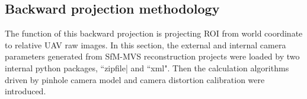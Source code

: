\subsection{Backward projection methodology}
\label{spp:backward}

% 

The function of this backward projection is projecting ROI from world coordinate to relative UAV raw images. In this section, the external and internal camera parameters generated from SfM-MVS reconstruction projects were loaded by two internal python packages, ``zipfile| and ``xml". Then the calculation algorithms driven by pinhole camera model and camera distortion calibration were introduced.

